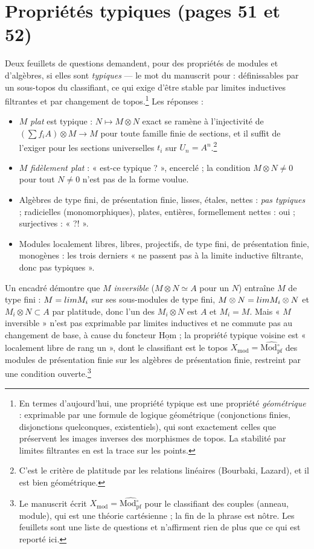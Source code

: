 \documentclass[11pt,a4paper]{article}
\begin{document}
\section*{Propriétés typiques (pages 51 et 52)}

Deux feuillets de questions demandent, pour des propriétés de modules et
d'algèbres, si elles sont \emph{typiques} — le mot du manuscrit pour :
définissables par un sous-topos du classifiant, ce qui exige d'être stable
par limites inductives filtrantes et par changement de topos.\footnote{En
termes d'aujourd'hui, une propriété typique est une propriété
\emph{géométrique} : exprimable par une formule de logique géométrique
(conjonctions finies, disjonctions quelconques, existentiels), qui sont
exactement celles que préservent les images inverses des morphismes de
topos. La stabilité par limites filtrantes en est la trace sur les points.}
Les réponses :
\begin{itemize}
\item $M$ \emph{plat} est typique : $N \mapsto M \otimes N$ exact se ramène à
l'injectivité de $(\sum f_{i}A) \otimes M \to M$ pour toute famille finie de
sections, et il suffit de l'exiger pour les sections universelles $t_{i}$
sur $U_{n} = A^{n}$.\footnote{C'est le critère de platitude par les
relations linéaires (Bourbaki, Lazard), et il est bien géométrique.}
\item $M$ \emph{fidèlement plat} : « est-ce typique ? », encerclé ; la
condition $M \otimes N \neq 0$ pour tout $N \neq 0$ n'est pas de la forme
voulue.
\item Algèbres de type fini, de présentation finie, lisses, étales, nettes :
\emph{pas typiques} ; radicielles (monomorphiques), plates, entières,
formellement nettes : oui ; surjectives : « ?! ».
\item Modules localement libres, libres, projectifs, de type fini, de
présentation finie, monogènes : les trois derniers « ne passent pas à la
limite inductive filtrante, donc pas typiques ».
\end{itemize}
Un encadré démontre que $M$ \emph{inversible} ($M \otimes N \simeq A$ pour un
$N$) entraîne $M$ de type fini : $M = \varinjlim M_{i}$ sur ses sous-modules
de type fini, $M \otimes N = \varinjlim M_{i} \otimes N$ et $M_{i} \otimes N
\subset A$ par platitude, donc l'un des $M_{i} \otimes N$ est $A$ et $M_{i} =
M$. Mais « $M$ inversible » n'est pas exprimable par limites inductives et ne
commute pas au changement de base, à cause du foncteur $\underline{\mathrm{Hom}}$ ;
la propriété typique voisine est « localement libre de rang un », dont le
classifiant est le topos $X_{\mathrm{mod}} = \widehat{\mathrm{Mod}_{\mathrm{pf}}
^{\circ}}$ des modules de présentation finie sur les algèbres de
présentation finie, restreint par une condition ouverte.\footnote{Le
manuscrit écrit $X_{\mathrm{mod}} = \widehat{\mathrm{Mod}^{\circ}_{\mathrm{pf}}}$
pour le classifiant des couples (anneau, module), qui est une théorie
cartésienne ; la fin de la phrase est nôtre. Les feuillets sont une liste
de questions et n'affirment rien de plus que ce qui est reporté ici.}
\end{document}
